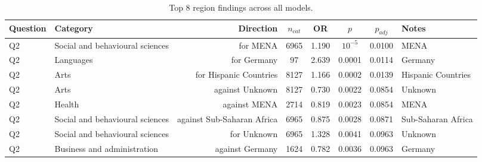 \begin{table}[htbp]
\centering
\caption{Top 8 region findings across all models.}
\label{tab:summary-region}
\begin{tabular}{llrccccl}
\toprule
Question & Category & Direction & $n_{cat}$ & OR & $p$ & $p_{adj}$ & Notes \\
\midrule
Q2 & Social and behavioural sciences & for MENA & 6965 & 1.190 & $10^{-5}$ & 0.0100 & MENA \\
Q2 & Languages & for Germany & 97 & 2.639 & 0.0001 & 0.0114 & Germany \\
Q2 & Arts & for Hispanic Countries & 8127 & 1.166 & 0.0002 & 0.0139 & Hispanic Countries \\
Q2 & Arts & against Unknown & 8127 & 0.730 & 0.0022 & 0.0854 & Unknown \\
Q2 & Health & against MENA & 2714 & 0.819 & 0.0023 & 0.0854 & MENA \\
Q2 & Social and behavioural sciences & against Sub-Saharan Africa & 6965 & 0.875 & 0.0028 & 0.0871 & Sub-Saharan Africa \\
Q2 & Social and behavioural sciences & for Unknown & 6965 & 1.328 & 0.0041 & 0.0963 & Unknown \\
Q2 & Business and administration & against Germany & 1624 & 0.782 & 0.0036 & 0.0963 & Germany \\
\bottomrule
\end{tabular}
\end{table}
